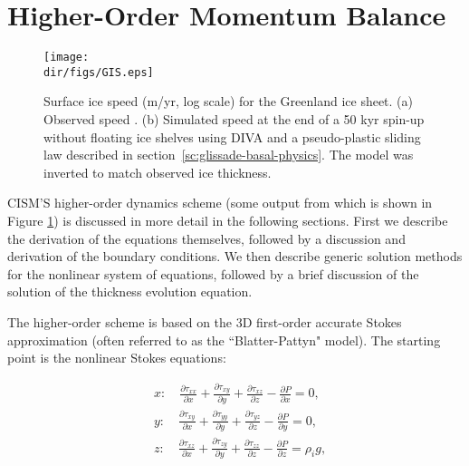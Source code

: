 
\section{Higher-Order Momentum Balance}
\label{sc:higher-order-mom}

\begin{figure}
  \begin{center}
    \texttt{[image: \\dir/figs/GIS.eps]}
   \end{center}
  \caption{Surface ice speed (m/yr, log scale) for the Greenland ice sheet. (a) Observed speed \citep{joughin2010measures}. (b) Simulated speed at the end of a 50 kyr spin-up without floating ice shelves using DIVA and a pseudo-plastic sliding law described in section~\ref{sc:glissade-basal-physics}. The model was inverted to match observed ice thickness.}
  \label{fig:GIS_PNAS}
\end{figure} 

CISM'S higher-order dynamics scheme (some output from which is shown in Figure \ref{fig:GIS_PNAS}) is discussed in more detail in the following sections. 
First we describe the derivation of the equations themselves, followed by a discussion and derivation of the boundary conditions.
We then describe generic solution methods for the nonlinear system of equations, followed by a
brief discussion of the solution of the thickness evolution equation.


The higher-order scheme is based on the 3D first-order accurate Stokes approximation (often referred to as the ``Blatter-Pattyn" model). The starting point is the nonlinear Stokes equations:

\begin{equation}
  \begin{split}
    & x:\quad \frac{\partial \tau _{xx}}{\partial x} + \frac{\partial \tau _{xy}}{\partial y} + \frac{\partial \tau _{xz}}{\partial z} - \frac{\partial P}{\partial x} = 0, \\ 
    & y:\quad \frac{\partial \tau _{xy}}{\partial x} + \frac{\partial \tau _{yy}}{\partial y} + \frac{\partial \tau _{yz}}{\partial z} - \frac{\partial P}{\partial y} = 0, \\ 
    & z:\quad \frac{\partial \tau _{xz}}{\partial x} + \frac{\partial \tau _{zy}}{\partial y} + \frac{\partial \tau _{zz}}{\partial z} - \frac{\partial P}{\partial z} = \rho_i g,
  \end{split}
\end{equation}

